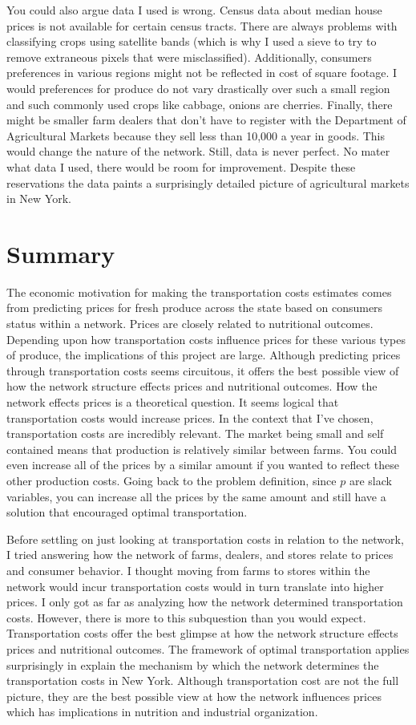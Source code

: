 \documentclass{report}
\begin{document}
You could also argue data I used is wrong. Census data about median house prices is not available for certain census tracts. There are always problems with classifying crops using satellite bands (which is why I used a sieve to try to remove extraneous pixels that were misclassified). Additionally, consumers preferences in various regions might not be reflected in cost of square footage. I would preferences for produce do not vary drastically over such a small region and such commonly used crops like cabbage, onions are cherries. Finally, there might be smaller farm dealers that don't have to register with the Department of Agricultural Markets because they sell less than 10,000 a year in goods. This would change the nature of the network. Still, data is never perfect. No mater what data I used, there would be room for improvement. Despite these reservations the data paints a surprisingly detailed picture of agricultural markets in New York. 

\section{Summary}

The economic motivation for making the transportation costs estimates comes from predicting prices for fresh produce across the state based on consumers status within a network. Prices are closely related to nutritional outcomes. Depending upon how transportation costs influence prices for these various types of produce, the implications of this project are large. Although predicting prices through transportation costs seems circuitous, it offers the best possible view of how the network structure effects prices and nutritional outcomes. How the network effects prices is a theoretical question. It seems logical that transportation costs would increase prices. In the context that I've chosen, transportation costs are incredibly relevant. The market being small and self contained means that production is relatively similar between farms. You could even increase all of the prices by a similar amount if you wanted to reflect these other production costs. Going back to the problem definition, since $p$ are slack variables, you can  increase all the prices by the same amount and still have a solution that encouraged optimal transportation.

Before settling on just looking at transportation costs in relation to the network, I tried answering how the network of farms, dealers, and stores relate to prices and consumer behavior. I thought moving from farms to stores within the network would incur transportation costs would in turn translate into higher prices. I only got as far as analyzing how the network determined transportation costs. However, there is more to this subquestion than you would expect. Transportation costs offer the best glimpse at how the network structure effects prices and nutritional outcomes. The framework of optimal transportation applies surprisingly in explain the mechanism by which the network determines the transportation costs in New York. Although transportation cost are not the full picture, they are the best possible view at how the network influences prices which has implications in nutrition and industrial organization.
\end{document}
